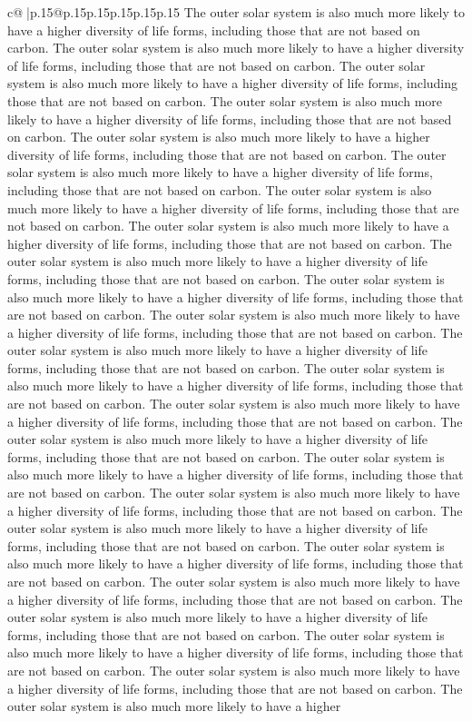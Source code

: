 \documentclass{article}
\begin{document}
{\begin{supertabular}{c@{$\;$}|p{.15\linewidth}@{}p{.15\linewidth}p{.15\linewidth}p{.15\linewidth}p{.15\linewidth}p{.15\linewidth}}
{{{The outer solar system is also much more likely to have a higher diversity of life forms, including those that are not based on carbon. The outer solar system is also much more likely to have a higher diversity of life forms, including those that are not based on carbon. The outer solar system is also much more likely to have a higher diversity of life forms, including those that are not based on carbon. The outer solar system is also much more likely to have a higher diversity of life forms, including those that are not based on carbon. The outer solar system is also much more likely to have a higher diversity of life forms, including those that are not based on carbon. The outer solar system is also much more likely to have a higher diversity of life forms, including those that are not based on carbon. The outer solar system is also much more likely to have a higher diversity of life forms, including those that are not based on carbon. The outer solar system is also much more likely to have a higher diversity of life forms, including those that are not based on carbon. The outer solar system is also much more likely to have a higher diversity of life forms, including those that are not based on carbon. The outer solar system is also much more likely to have a higher diversity of life forms, including those that are not based on carbon. The outer solar system is also much more likely to have a higher diversity of life forms, including those that are not based on carbon. The outer solar system is also much more likely to have a higher diversity of life forms, including those that are not based on carbon. The outer solar system is also much more likely to have a higher diversity of life forms, including those that are not based on carbon. The outer solar system is also much more likely to have a higher diversity of life forms, including those that are not based on carbon. The outer solar system is also much more likely to have a higher diversity of life forms, including those that are not based on carbon. The outer solar system is also much more likely to have a higher diversity of life forms, including those that are not based on carbon. The outer solar system is also much more likely to have a higher diversity of life forms, including those that are not based on carbon. The outer solar system is also much more likely to have a higher diversity of life forms, including those that are not based on carbon. The outer solar system is also much more likely to have a higher diversity of life forms, including those that are not based on carbon. The outer solar system is also much more likely to have a higher diversity of life forms, including those that are not based on carbon. The outer solar system is also much more likely to have a higher diversity of life forms, including those that are not based on carbon. The outer solar system is also much more likely to have a higher diversity of life forms, including those that are not based on carbon. The outer solar system is also much more likely to have a higher diversity of life forms, including those that are not based on carbon. The outer solar system is also much more likely to have a higher }}}
\end{supertabular}}
\end{document}
